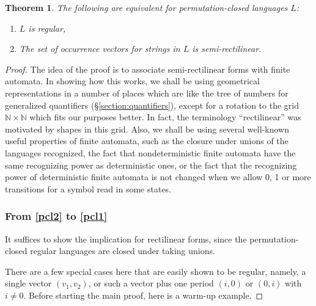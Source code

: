 \documentclass[12pt,oneside,reqno]{amsart}
\newtheorem{theorem}{Theorem}
\theoremstyle{definition}
\begin{document}

\begin{theorem} 	The following are equivalent  for permutation-closed languages $L$: \begin{enumerate}[label=(\alph*)]
  \item \label{pcl1} $L$ is regular, 
  \item \label{pcl2} The set of occurrence vectors for strings in $L$ is semi-rectilinear.
\end{enumerate}
	\end{theorem}

\begin{proof}  The idea of the proof is to associate semi-rectilinear forms with finite automata. In showing how this works, we  shall be using geometrical representations in a number of places which are like the tree of numbers for generalized quantifiers (\S\ref{section:quantifiers}), except for a rotation to the grid $\mathbb{N} \times \mathbb{N}$ which fits our purposes better. In fact, the terminology ``rectilinear'' was motivated by shapes in this grid. Also, we shall be using several well-known useful properties of finite automata, such as the closure under unions of the languages recognized, the fact that nondeterministic finite automata have the same recognizing power as deterministic ones, or the fact that the recognizing power of deterministic finite automata is not changed when we allow 0, 1 or more transitions for a symbol read in some states.

\subsubsection*{From \ref{pcl2} to \ref{pcl1}} It suffices to show the implication for rectilinear forms, since the permutation-closed regular languages are closed under taking unions. 

There are a few special cases here that are easily shown to be regular, namely, a single vector $(v_1, v_2)$, or such a vector plus one period $(i, 0)$ or $(0, i)$ with $i \neq 0$. Before starting the main proof, here is a warm-up example.


\end{proof}
\end{document}
